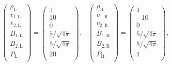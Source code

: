 \begin{equation}
\left(
\begin{array}{c}
\rho_\mathrm{L} \\
v_\mathrm{1,L} \\
v_\mathrm{2,L} \\
B_\mathrm{1,L} \\
B_\mathrm{2,L} \\
P_\mathrm{L} \\
\end{array}
\right)
= 
\left(
\begin{array}{c}
1 \\
10 \\
0 \\
5/\sqrt{4\pi} \\
5/\sqrt{4\pi} \\
20 \\
\end{array}
\right),\;\;\;
\left(
\begin{array}{c}
\rho_\mathrm{R} \\
v_\mathrm{1,R} \\
v_\mathrm{2,R} \\
B_\mathrm{1,R} \\
B_\mathrm{2,R} \\
P_\mathrm{R} \\
\end{array}
\right)
= 
\left(
\begin{array}{c}
1 \\
-10 \\
0 \\
5/\sqrt{4\pi} \\
5/\sqrt{4\pi} \\
1 \\
\end{array}
\right),\;\;\;
\label{shini}
\end{equation}



